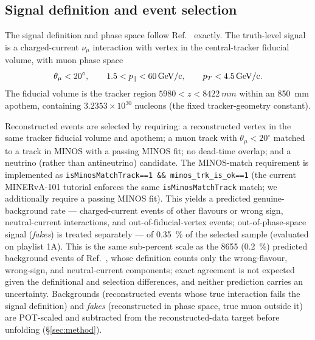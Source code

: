 \subsection{Signal definition and event selection}
\label{sec:selection}
The signal definition and phase space follow Ref.~\cite{MINERvA:2021owq}
exactly. The truth-level signal is a charged-current $\nu_\mu$ interaction
with vertex in the central-tracker fiducial volume, with muon phase space
\begin{equation*}
  \theta_\mu < 20^{\circ},\qquad
  1.5 < p_{\parallel} < \SI{60}{GeV/c},\qquad
  p_{T} < \SI{4.5}{GeV/c}.
\end{equation*}
The fiducial volume is the tracker region $5980 < z < \SI{8422}{mm}$ within an
\SI{850}{mm} apothem, containing $3.2353\times10^{30}$ nucleons (the fixed
tracker-geometry constant).

Reconstructed events are selected by requiring: a reconstructed vertex in the
same tracker fiducial volume and apothem; a muon track with
$\theta_\mu<20^{\circ}$ matched to a track in MINOS with a passing MINOS fit;
no dead-time overlap; and a neutrino (rather than antineutrino) candidate.
The MINOS-match requirement is implemented as
\texttt{isMinosMatchTrack==1 \&\& minos\_trk\_is\_ok==1} (the current
MINERvA-101 tutorial enforces the same \texttt{isMinosMatchTrack} match; we
additionally require a passing MINOS fit). This yields a predicted genuine-background rate --- charged-current events of
other flavours or wrong sign, neutral-current interactions, and
out-of-fiducial-vertex events; out-of-phase-space signal (\emph{fakes}) is
treated separately --- of \SI{0.35}{\percent} of the selected sample
(evaluated on playlist 1A). This is
the same sub-percent scale as the 8655 (\SI{0.2}{\percent}) predicted
background events of Ref.~\cite{MINERvA:2021owq}, whose definition counts
only the wrong-flavour, wrong-sign, and neutral-current components; exact
agreement is not expected given the definitional and selection differences,
and neither prediction carries an uncertainty. Backgrounds (reconstructed events whose true
interaction fails the signal definition) and \emph{fakes} (reconstructed in
phase space, true muon outside it) are POT-scaled and subtracted from the
reconstructed-data target before unfolding (\S\ref{sec:method}).

